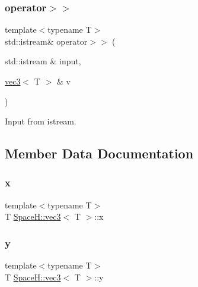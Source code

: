 \subsubsection{\texorpdfstring{operator$>$$>$}{operator>>}\hspace{0.1cm}{\footnotesize\ttfamily [4/4]}}
{\footnotesize\ttfamily template$<$typename T$>$ \\
std\+::istream\& operator$>$$>$ (\begin{DoxyParamCaption}\item[{std\+::istream \&}]{input,  }\item[{\mbox{\hyperlink{struct_space_h_1_1vec3}{vec3}}$<$ T $>$ \&}]{v }\end{DoxyParamCaption})\hspace{0.3cm}{\ttfamily [friend]}}



Input from istream. 



\subsection{Member Data Documentation}
\mbox{\label{struct_space_h_1_1vec3_a5fc1d6e363cfd8ed5835576d2b8c8163}} 
\subsubsection{\texorpdfstring{x}{x}}
{\footnotesize\ttfamily template$<$typename T$>$ \\
T \mbox{\hyperlink{struct_space_h_1_1vec3}{Space\+H\+::vec3}}$<$ T $>$\+::x}

\mbox{\label{struct_space_h_1_1vec3_a28ae016a54c1d0929b16a4b80a7b286f}} 
\subsubsection{\texorpdfstring{y}{y}}
{\footnotesize\ttfamily template$<$typename T$>$ \\
T \mbox{\hyperlink{struct_space_h_1_1vec3}{Space\+H\+::vec3}}$<$ T $>$\+::y}

\mbox{\label{struct_space_h_1_1vec3_a079eb453e23db2c765449e211400c2ac}} 
